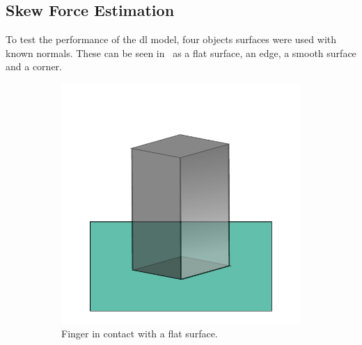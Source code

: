 \subsection{Skew Force Estimation}\label{sec:1-tactile-perception-experimental-setup-skew-force-estimation}

To test the performance of the \gls{dl} model, four objects surfaces were used with known normals. These can be seen in~ as a flat surface, an edge, a smooth surface and a corner.

\begin{figure}[h]
	\centering
	\begin{subfigure}[b]{0.24\textwidth}
		\centering
		\includegraphics[width=\textwidth]{chapters/1-tactile-perception/fig/inkscape/flat-contact-3d.pdf}
		\caption{Finger in contact with a flat surface.}
		\label{fig:flat-contact}
	\end{subfigure}
	\hfill
	\begin{subfigure}[b]{0.24\textwidth}
		\centering

\end{subfigure}
\end{figure}
